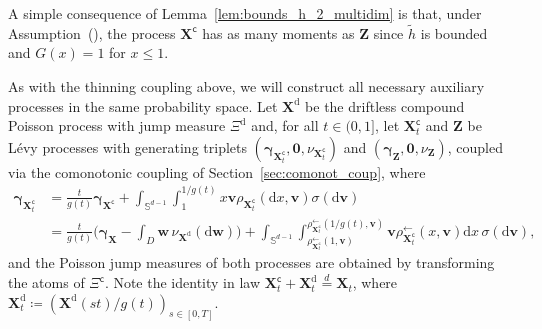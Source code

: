 \documentclass[en,oneside,bbfont,article]{amsart}
\theoremstyle{remark}
\theoremstyle{definition}
\theoremstyle{definition}
\newcommand\N{\mathbb{N}}
\newcommand\Sp{\mathbb{S}}
\newcommand\1{\mathds{1}}
\newcommand\la{\leftarrow}
\renewcommand\le{\leqslant}
\newcommand\eqd{\overset{d}{=}}
\newcommand\co{\mathsf{c}}
\newcommand{\D}{\mathrm{d}}
\newcommand{\wt}[1]{\widetilde{#1}}
\begin{document}
A simple consequence of Lemma~\ref{lem:bounds_h_2_multidim} is that, under Assumption~(), the process $\bm{X}^\co$ has as many moments as $\bm{Z}$ since $\wt h$ is bounded and $G(x)=1$ for $x\le 1$.

As with the thinning coupling above, we will construct all necessary auxiliary processes in the same probability space. Let $\bm{X}^\D$ be the driftless compound Poisson process with jump measure $\Xi^\D$ and, for all $t\in(0,1]$, let $\bm{X}^\co_t$ and $\bm{Z}$ be L\'evy processes with generating triplets $(\bm{\gamma}_{\bm{X}^\co_t},\bm{0},\nu_{\bm{X}_t^\co})$ and $(\bm{\gamma}_{\bm{Z}},\bm{0},\nu_{\bm{Z}})$, coupled via the comonotonic coupling of Section~\ref{sec:comonot_coup}, where 
\begin{align*}
\bm{\gamma}_{\bm{X}^\co_t}
&=\frac{t}{g(t)}\bm{\gamma}_{\bm{X}^\co}
+ \int_{\Sp^{d-1}} \int_1^{1/g(t)}  %
x \bm{v} \rho_{\bm{X}_t^\co}(
 \D x,\bm{v})
 \sigma(\D \bm{v})\\
&=\frac{t}{g(t)}\bigg(\bm{\gamma}_{\bm{X}}
-\int_{D}\bm{w}\,\nu_{\bm{X}^\D}(\D\bm{w})
\bigg)
+ \int_{\Sp^{d-1}} \int_{\rho^{\la}_{\bm{X}_t^\co}(1,\bm{v})}^{\rho^{\la}_{\bm{X}_t^\co}(1/g(t),\bm{v})}  %
 \bm{v} \rho^{\la}_{\bm{X}_t^\co}(x,\bm{v}) %
 \D x\,%
 \sigma(\D \bm{v}),
\end{align*}
and the Poisson jump measures of both processes are obtained by transforming the atoms of $\Xi^\co$. Note the identity in law $\bm{X}^\co_t+\bm{X}^\D_t\eqd \bm{X}_t$, where $\bm{X}^\D_t\coloneqq (\bm{X}^\D(st)/g(t))_{s\in[0,T]}$. %
\end{document}

